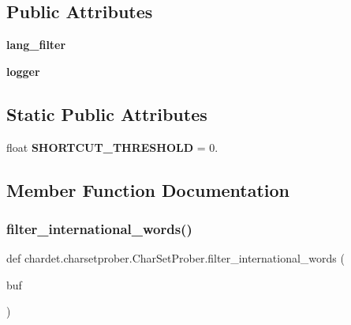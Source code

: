 \subsection*{Public Attributes}
\begin{DoxyCompactItemize}
\item 
\mbox{\label{classchardet_1_1charsetprober_1_1_char_set_prober_ae4312941374ad1606af8cf9e93cdba33}} 
{\bfseries lang\+\_\+filter}
\item 
\mbox{\label{classchardet_1_1charsetprober_1_1_char_set_prober_a9aa8a8a8d55c8266e7897c1a1fca5b56}} 
{\bfseries logger}
\end{DoxyCompactItemize}
\subsection*{Static Public Attributes}
\begin{DoxyCompactItemize}
\item 
\mbox{\label{classchardet_1_1charsetprober_1_1_char_set_prober_a46cb2d32de333bc078572c9348c89a77}} 
float {\bfseries S\+H\+O\+R\+T\+C\+U\+T\+\_\+\+T\+H\+R\+E\+S\+H\+O\+LD} = 0.
\end{DoxyCompactItemize}


\subsection{Member Function Documentation}
\mbox{\label{classchardet_1_1charsetprober_1_1_char_set_prober_a950ce6a8b558bd6dedb10a699ab45338}} 
\subsubsection{\texorpdfstring{filter\+\_\+international\+\_\+words()}{filter\_international\_words()}}
{\footnotesize\ttfamily def chardet.\+charsetprober.\+Char\+Set\+Prober.\+filter\+\_\+international\+\_\+words (\begin{DoxyParamCaption}\item[{}]{buf }\end{DoxyParamCaption})\hspace{0.3cm}{\ttfamily [static]}}

